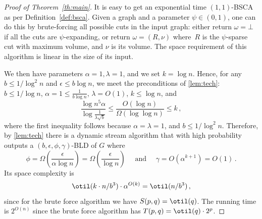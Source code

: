 \begin{proof}[Proof of Theorem~\ref{th:main}]
	It is easy to get an exponential time $(1,1)$-BSCA as per Definition~\ref{def:bsca}. Given a graph and a parameter $\psi \in (0,1)$, one can do this by brute-forcing all possible cuts in the input graph: either return $\omega=\bot$ if all the cuts are $\psi$-expanding, or return $\omega=(R,\nu)$ where~$R$ is the $\psi$-sparse cut with maximum volume, and $\nu$ is its volume. The space requirement of this algorithm is linear in the size of its input.
	
	We then have parameters $\alpha=1,\lambda=1$, and we set $k=\log n$.  Hence, for any $b \le 1/\log^2 n$ and $\epsilon \le b \log n$, we meet the preconditions  of  \cref{lem:tech}: $b \le 1/\log n$, $\alpha = 1 \le \frac{1}{b\log n}$, $\lambda= O(1)$, $k \le \log n$, and
	\begin{equation*}
		\frac{\log {n^5\alpha }}{\log  \frac{1}{\lambda \sqrt{b}}} \le \frac{O(\log n)}{\Omega(\log \log n)} \le k \, ,
	\end{equation*}
	where the first inequality follows because $\alpha=\lambda=1$, and $b \le 1/\log^2 n$.
	Therefore, by \cref{lem:tech} there is a dynamic stream algorithm that with high probability outputs a $(b, \epsilon, \phi, \gamma)$-BLD of $G$ where
	\begin{equation*}
		\phi = \Omega\left(\frac{\epsilon}{\alpha \log n}\right) = \Omega\left(\frac{\epsilon}{ \log n}\right) \quad \text{ and } \quad \gamma = O(\alpha^{k+1})= O(1) \, .
	\end{equation*}
	Its space complexity is
	\begin{equation*}
		\otil(k \cdot n/b^3) \cdot \alpha^{O(k)} = \otil(n/b^3) \, ,
	\end{equation*}
	since for the brute force algorithm we have $S(p,q)=\otil(q)$. The running time is $2^{O(n)}$ since the brute force algorithm has $T(p,q)=\otil(q)\cdot 2^p$.
\end{proof}
